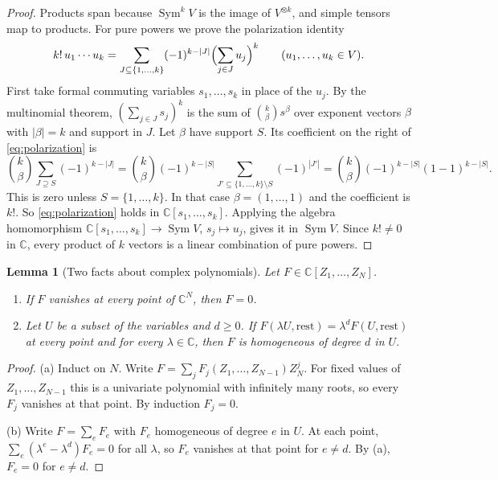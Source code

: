 \documentclass[11pt]{article}
\newtheorem{lemma}[theorem]{Lemma}
\theoremstyle{definition}
\theoremstyle{remark}
\DeclareMathOperator{\Sym}{Sym}
\newcommand{\C}{\mathbb C}
\begin{document}
\begin{proof}
Products span because $\Sym^kV$ is the image of $V^{\otimes k}$, and simple
tensors map to products. For pure powers we prove the polarization identity
\begin{equation}\label{eq:polarization}
 k!\,u_1\cdots u_k
 =\sum_{J\subseteq\{1,\ldots,k\}}(-1)^{k-|J|}
   \Bigl(\sum_{j\in J}u_j\Bigr)^k
 \qquad(u_1,\ldots,u_k\in V).
\end{equation}
First take formal commuting variables $s_1,\ldots,s_k$ in place of the
$u_j$. By the multinomial theorem, $(\sum_{j\in J}s_j)^k$ is the sum of
$\binom{k}{\beta}s^\beta$ over exponent vectors $\beta$ with $|\beta|=k$ and
support in $J$. Let $\beta$ have support $S$. Its coefficient on the right
of \eqref{eq:polarization} is
\[
 \binom k\beta\sum_{J\supseteq S}(-1)^{k-|J|}
 =\binom k\beta(-1)^{k-|S|}\sum_{J'\subseteq\{1,\ldots,k\}\setminus S}(-1)^{|J'|}
 =\binom k\beta(-1)^{k-|S|}(1-1)^{k-|S|}.
\]
This is zero unless $S=\{1,\ldots,k\}$. In that case $\beta=(1,\ldots,1)$
and the coefficient is $k!$. So \eqref{eq:polarization} holds in
$\C[s_1,\ldots,s_k]$. Applying the algebra homomorphism
$\C[s_1,\ldots,s_k]\to\Sym V$, $s_j\mapsto u_j$, gives it in $\Sym V$. Since
$k!\ne0$ in $\C$, every product of $k$ vectors is a linear combination of
pure powers.
\end{proof}

\begin{lemma}[Two facts about complex polynomials]\label{lem:poly}
Let $F\in\C[Z_1,\ldots,Z_N]$.
\begin{enumerate}[label=(\alph*),nosep]
\item If $F$ vanishes at every point of $\C^N$, then $F=0$.
\item Let $U$ be a subset of the variables and $d\ge0$. If
$F(\lambda U,\text{rest})=\lambda^dF(U,\text{rest})$ at every point and for
every $\lambda\in\C$, then $F$ is homogeneous of degree $d$ in $U$.
\end{enumerate}
\end{lemma}

\begin{proof}
(a) Induct on $N$. Write $F=\sum_jF_j(Z_1,\ldots,Z_{N-1})Z_N^j$. For fixed
values of $Z_1,\ldots,Z_{N-1}$ this is a univariate polynomial with
infinitely many roots, so every $F_j$ vanishes at that point. By induction
$F_j=0$.

(b) Write $F=\sum_eF_e$ with $F_e$ homogeneous of degree $e$ in $U$. At
each point, $\sum_e(\lambda^e-\lambda^d)F_e=0$ for all $\lambda$, so
$F_e$ vanishes at that point for $e\ne d$. By (a), $F_e=0$ for $e\ne d$.
\end{proof}
\end{document}
